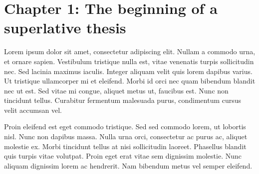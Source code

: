 \section{Chapter 1: The beginning of a superlative thesis}

Lorem ipsum dolor sit amet, consectetur adipiscing elit. Nullam a commodo urna, et ornare sapien. Vestibulum tristique nulla est, vitae venenatis turpis sollicitudin nec. Sed lacinia maximus iaculis. Integer aliquam velit quis lorem dapibus varius. Ut tristique ullamcorper mi et eleifend. Morbi id orci nec quam bibendum blandit nec ut est. Sed vitae mi congue, aliquet metus ut, faucibus est. Nunc non tincidunt tellus. Curabitur fermentum malesuada purus, condimentum cursus velit accumsan vel.

Proin eleifend est eget commodo tristique. Sed sed commodo lorem, ut lobortis nisl. Nunc non dapibus massa. Nulla urna orci, consectetur ac purus ac, aliquet molestie ex. Morbi tincidunt tellus at nisi sollicitudin laoreet. Phasellus blandit quis turpis vitae volutpat. Proin eget erat vitae sem dignissim molestie. Nunc aliquam dignissim lorem ac hendrerit. Nam bibendum metus vel semper eleifend.
